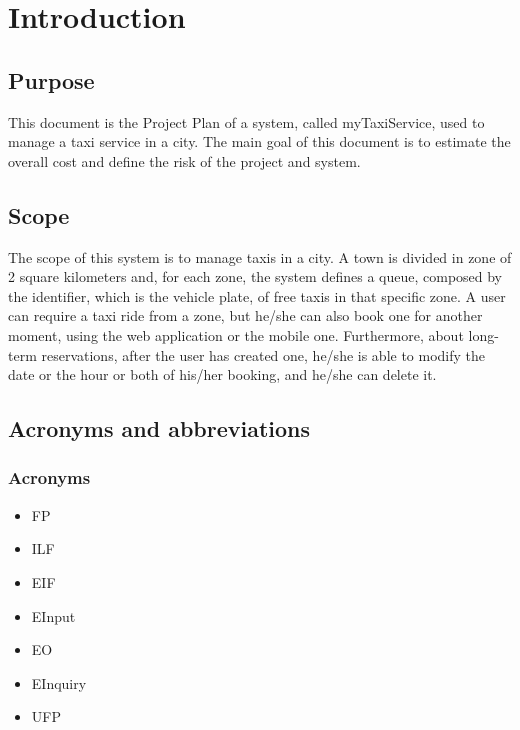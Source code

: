 \section{Introduction}
\subsection{Purpose}
	This document is the Project Plan of a system, called myTaxiService, used to manage  a taxi service in a city. The main goal of this document is to estimate the overall cost and define the risk of the project and system.
\subsection{Scope}
	The scope of this system is to manage taxis in a city. A town is divided in zone of 2 square kilometers and, for each zone, the system defines a queue, composed by the identifier, which is the vehicle plate, of free taxis in that specific zone. A user can require a taxi ride from a zone, but he/she can also book one for another moment, using the web application or the mobile one. Furthermore, about long-term reservations, after the user has created one, he/she is able to modify the date or the hour or both of his/her booking, and he/she can delete it. 
\subsection{Acronyms and abbreviations}
	\subsubsection{Acronyms}
		\begin{itemize}
			\item FP
			\item ILF
			\item EIF
			\item EInput
			\item EO
			\item EInquiry
			\item UFP
		\end{itemize}
